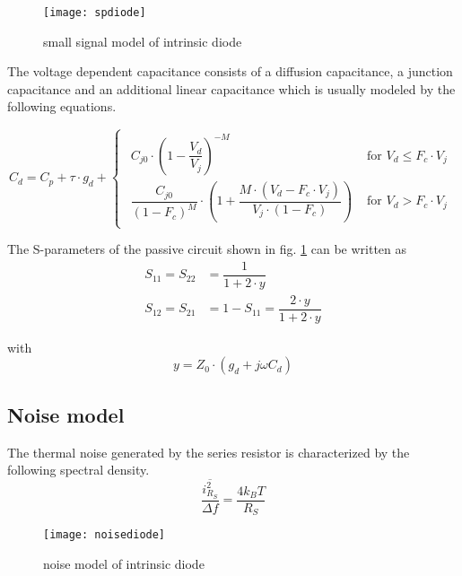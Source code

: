 \begin{figure}[ht]
\begin{center}
\texttt{[image: spdiode]}
\end{center}
\caption{small signal model of intrinsic diode}
\label{fig:spdiode}
\end{figure}
\FloatBarrier

The voltage dependent capacitance consists of a diffusion capacitance,
a junction capacitance and an additional linear capacitance which is
usually modeled by the following equations.

\begin{equation}
C_{d} = C_p + \tau \cdot g_{d} +
\begin{cases}
\begin{array}{ll}
C_{j0}\cdot \left(1 - \dfrac{V_{d}}{V_{j}}\right)^{-M} & \textrm{ for } V_{d} \le F_c\cdot V_j\\
\dfrac{C_{j0}}{\left(1 - F_c\right)^M}\cdot \left(1 + \dfrac{M\cdot \left(V_{d} - F_c\cdot V_j\right)}{V_{j}\cdot\left(1 - F_c\right)}\right) & \textrm{ for } V_{d} > F_c\cdot V_j
\end{array}
\end{cases}
\end{equation}

The S-parameters of the passive circuit shown in
fig. \ref{fig:spdiode} can be written as
\begin{align}
S_{11} = S_{22} &= \dfrac{1}{1 + 2\cdot y}\\
S_{12} = S_{21} &= 1 - S_{11} = \dfrac{2\cdot y}{1 + 2\cdot y}
\end{align}

with
\begin{equation}
y = Z_{0}\cdot \left(g_{d} + j\omega C_{d}\right)
\end{equation}

\subsection{Noise model}
\label{sec:nw_diode}

The thermal noise generated by the series resistor is characterized by
the following spectral density.
\begin{equation}
\dfrac{\overline{i_{R_S}^2}}{\Delta f} = \dfrac{4 k_B T}{R_S}
\end{equation}

\begin{figure}[ht]
\begin{center}
\texttt{[image: noisediode]}
\end{center}
\caption{noise model of intrinsic diode}
\label{fig:noisediode}
\end{figure}
\FloatBarrier

